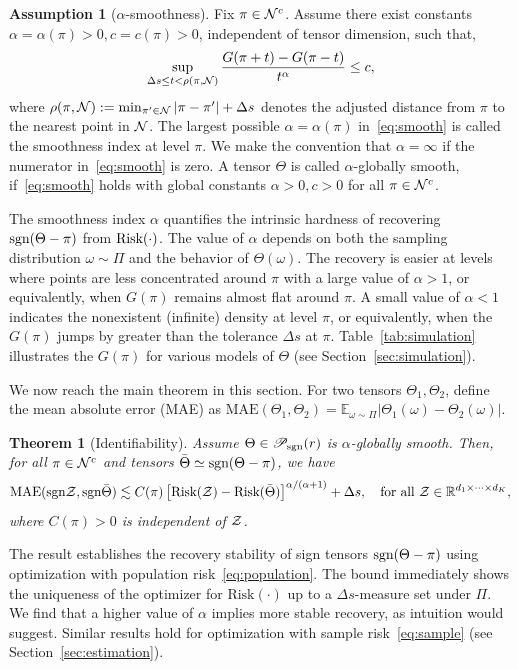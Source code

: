 \documentclass{article}
\theoremstyle{plain}
\newtheorem{thm}{Theorem}
\theoremstyle{definition}
\newtheorem{assumption}{Assumption}
\def\sign{\textup{sgn}}
\def\caliP{\mathscr{P}_{\textup{sgn}}}
\def\risk{\textup{Risk}}
\begin{document}
\begin{assumption}[$\alpha$-smoothness]\label{ass:margin} Fix $\pi \in\mathcal{N}^c$. Assume there exist constants $\alpha=\alpha(\pi)> 0, c=c(\pi) >0$, independent of tensor dimension, such that, 
\begin{equation}\label{eq:smooth}
\sup_{\Delta s \leq t<\rho(\pi, \mathcal{N})}{G(\pi+{t})-G(\pi-{t})\over t^\alpha} \leq c,
\end{equation}
where $\rho(\pi,\mathcal{N}):=\min_{\pi'\in \mathcal{N}}|\pi-\pi'|+\Delta s$ denotes the adjusted distance from $\pi$ to the nearest point in $\mathcal{N}$. The largest possible $\alpha=\alpha(\pi)$ in~\eqref{eq:smooth} is called the smoothness index at level $\pi$. We make the convention that $\alpha=\infty$ if the numerator in~\eqref{eq:smooth} is zero. A tensor $\Theta$ is called $\alpha$-globally smooth, if~\eqref{eq:smooth} holds with global constants $\alpha>0, c>0$ for all $\pi\in\mathcal{N}^c$. 
\end{assumption}

The smoothness index $\alpha$ quantifies the intrinsic hardness of recovering $\sign(\Theta-\pi)$ from $\risk(\cdot)$. 
The value of $\alpha$ depends on both the sampling distribution $\omega\sim \Pi$ and the behavior of $\Theta(\omega)$. 
The recovery is easier at levels where points are less concentrated around $\pi$ with a large value of $\alpha>1$, or equivalently, when $G(\pi)$ remains almost  flat around $\pi$. A small value of $\alpha<1$ indicates the nonexistent (infinite) density at level $\pi$, or equivalently, when the $G(\pi)$ jumps by greater than the tolerance $\Delta s$ at $\pi$. Table~\ref{tab:simulation} illustrates the $G(\pi)$ for various models of $\Theta$ (see Section~\ref{sec:simulation}). 

We now reach the main theorem in this section. For two tensors $\Theta_1,\Theta_2$, define the mean absolute error (MAE) as
$\text{MAE}(\Theta_1, \Theta_2)=\mathbb{E}_{\omega\sim \Pi}|\Theta_1(\omega)-\Theta_2(\omega)|.$

\vspace{.05cm}
\begin{thm}[Identifiability]\label{thm:population}Assume $\Theta\in\caliP(r)$ is $\alpha$-globally smooth. Then, for all $\pi\in \mathcal{N}^c$ and tensors $\bar \Theta \simeq \sign(\Theta-\pi)$, we have
\[
\textup{MAE}(\sign \tZ, \sign \bar \Theta) \lesssim C(\pi)\left[\textup{Risk}(\tZ)-\textup{Risk}( \bar \Theta)\right]^{\alpha/(\alpha+1)}+\Delta s, \quad \text{for all }\tZ\in\mathbb{R}^{d_1\times \cdots \times d_K},
\]
where $C(\pi)>0$ is independent of $\mathcal{Z}$. 
\end{thm}
The result establishes the recovery stability of sign tensors $\sign (\Theta-\pi)$ using optimization with population risk~\eqref{eq:population}. The bound immediately shows the uniqueness of the optimizer for $\text{Risk}(\cdot)$ up to a  $\Delta s$-measure set under $\Pi$. We find that a higher value of $\alpha$ implies more stable recovery, as intuition would suggest. Similar results hold for optimization with sample risk~\eqref{eq:sample} (see Section~\ref{sec:estimation}). 
\end{document}
